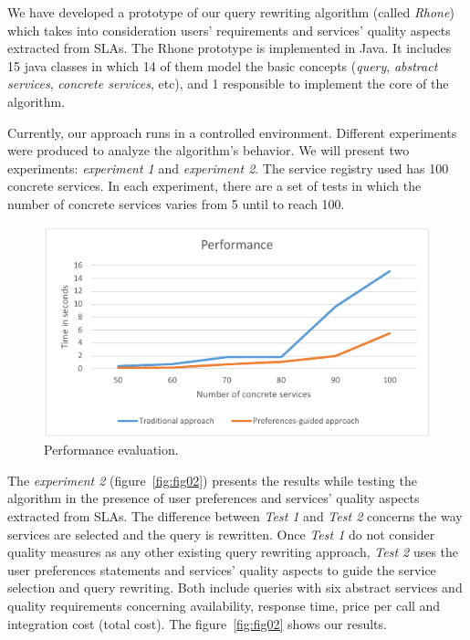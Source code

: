 We have developed a prototype of our query rewriting algorithm (called \textit{Rhone}) which takes into consideration users' requirements and services' quality aspects extracted from SLAs.
The Rhone prototype is implemented in Java.
It includes 15 java classes in which 14 of them model the basic concepts 
(\textit{query}, \textit{abstract services}, \textit{concrete services}, etc), 
and 1 responsible to implement the core of the algorithm. 

Currently, our approach runs in a controlled environment. 
Different experiments were produced to analyze the algorithm's behavior.
We will present two experiments: \textit{experiment 1} and \textit{experiment 2}.
The service registry used has 100 concrete services. 
In each experiment, there are a set of tests in which the number of concrete 
services varies from 5 until to reach 100.

\begin{figure}[!h]
\centering
\includegraphics[scale=0.8]{fig1.pdf}
\caption{Performance evaluation.}\label{fig01}
\end{figure} 

The \textit{experiment 2} (figure~\ref{fig:fig02}) presents the results while testing the algorithm in the presence of user preferences and services' quality aspects extracted from SLAs.  The difference between \textit{Test 1} and \textit{Test 2} concerns the way services are selected and the query is rewritten. Once \textit{Test 1} do not consider quality measures as any other existing query rewriting approach, \textit{Test 2} uses the user preferences statements and services' quality aspects to guide the service selection and query rewriting.
Both include queries with six abstract services and quality requirements concerning availability, response time, price per call and integration cost (total cost). The figure~\ref{fig:fig02} shows our results. 

